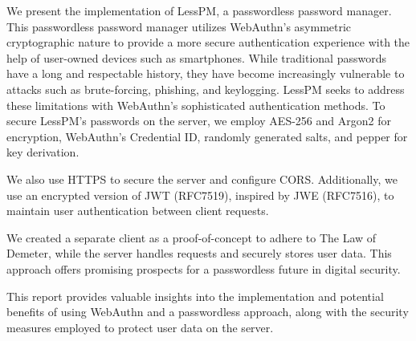 We present the implementation of LessPM, a passwordless password manager.
This passwordless password manager utilizes WebAuthn's asymmetric cryptographic
nature to provide a more secure authentication experience with the help of
user-owned devices such as smartphones.
While traditional passwords have a long and respectable history, they have
become increasingly vulnerable to attacks such as brute-forcing, phishing, and
keylogging.
LessPM seeks to address these limitations with WebAuthn's sophisticated
authentication methods.
To secure LessPM's passwords on the server, we employ AES-256 and Argon2 for
encryption, WebAuthn's Credential ID, randomly generated salts, and pepper for
key derivation.

We also use HTTPS to secure the server and configure CORS.
Additionally, we use an encrypted version of JWT (RFC7519), inspired by
JWE (RFC7516), to maintain user authentication between client requests.

We created a separate client as a proof-of-concept to adhere to The Law of
Demeter, while the server handles requests and securely stores user data.
This approach offers promising prospects for a passwordless future in digital
security.

This report provides valuable insights into the implementation and potential
benefits of using WebAuthn and a passwordless approach, along with the security
measures employed to protect user data on the server.